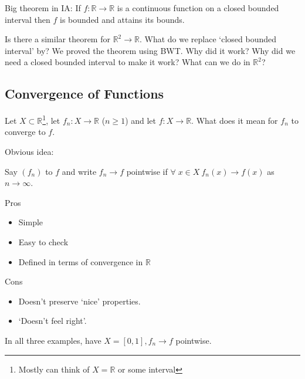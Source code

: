     Big theorem in IA: If $f: \mathbb{R} \to \mathbb{R}$ is a continuous function on a closed bounded interval then $f$ is bounded and attains its bounds.

    Is there a similar theorem for $\mathbb{R}^2 \to \mathbb{R}$.
    What do we replace `closed bounded interval' by?
    We proved the theorem using BWT.
    Why did it work?
    Why did we need a closed bounded interval to make it work?
    What can we do in $\mathbb{R}^2$?

    \subsection{Convergence of Functions}
    Let $X \subset \mathbb{R}$\footnote{Mostly can think of $X = \mathbb{R}$ or some interval}, let $f_n : X \to \mathbb{R}$ ($n \geq 1$) and let $f: X \to \mathbb{R}$.
    What does it mean for $f_n$ to converge to $f$.

    Obvious idea:
    \begin{definition}
        Say $(f_n)$  to $f$ and write $f_n \to f$ pointwise if $\forall \; x \in X \ f_n(x) \to f(x)$ as $n \to \infty$.
    \end{definition} 

    Pros
    \begin{itemize}
        \item Simple
        \item Easy to check
        \item Defined in terms of convergence in $\mathbb{R}$
    \end{itemize} 
    Cons
    \begin{itemize}
        \item Doesn't preserve `nice' properties.
        \item `Doesn't feel right'.
    \end{itemize} 

    In all three examples, have $X = [0, 1], f_n \to f$ pointwise.

